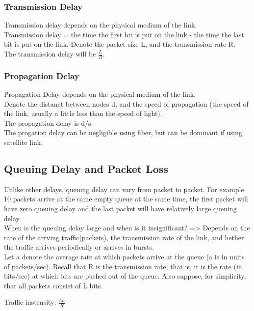 \subsubsection{Transmission Delay}
Transmission delay depends on the physical medium of the link.\\
Transmission delay = the time the first bit is put on the link - the time the last bit is put on the link.
Denote the packet size L, and the transmission rate R.\\
The transmission delay will be $\frac{L}{R}$.

\subsubsection{Propagation Delay}
Propagation Delay depends on the physical medium of the link.\\
Denote the distanct between nodes d, and the speed of propagation (the speed of the link, usually a little less than the speed of light).\\
The propagation delay is d/s.\\
The progation delay can be negligible using fiber, but can be dominant if using satellite link.

\subsection{Queuing Delay and Packet Loss}
Unlike other delays, queuing delay can vary from packet to packet. For example 10 packets arrive at the same empty queue at the same time,
the first packet will have zero queuing delay and the last packet will have relatively large queuing delay.\\
When is the queuing delay large and when is it insignificant? => Depends on the rate of the arrving traffic(packets), the transmission rate
of the link, and hether the traffic arrives periodically or arrives in bursts.\\

Let a denote the average
rate at which packets arrive at the queue (a is in units of packets/sec). Recall that R is
the transmission rate; that is, it is the rate (in bits/sec) at which bits are pushed out of
the queue. Also suppose, for simplicity, that all packets consist of L bits.\\

\begin{center}
    Traffic instensity: $\frac{La}{R}$
\end{center}

